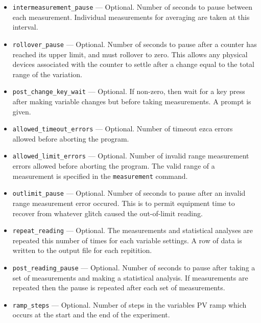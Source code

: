 \begin{itemize}
\begin{itemize}
\begin{itemize}
        \item {\verb+intermeasurement_pause+} ---  Optional. Number of seconds to pause between each measurement.
                Individual measurements for averaging are taken at this interval.
        \item {\verb+rollover_pause+} ---  Optional. Number of seconds to pause after a counter has reached
                its upper limit, and must rollover to zero. This allows any physical devices
                associated with the counter to settle after a change equal to the total range
                of the variation.
        \item {\verb+post_change_key_wait+} ---  Optional. If non-zero, then wait for a key press after
                making variable changes but before taking measurements. A prompt is given.
        \item {\verb+allowed_timeout_errors+} ---  Optional. Number of timeout ezca errors allowed before aborting the
                program. 
        \item {\verb+allowed_limit_errors+} ---  Optional. Number of invalid range measurement errors 
                allowed before aborting the
                program. The valid range of a measurement is specified in the {\verb+measurement+} command.
        \item {\verb+outlimit_pause+} ---  Optional. Number of seconds to pause after an invalid range measurement error
                occured. This is to permit equipment time to recover from whatever glitch caused the out-of-limit
                reading.
        \item {\verb+repeat_reading+} --- Optional. The measurements and statistical analyses are repeated this number of 
                times for each variable settings. A row of data is written to the output file
                for each repitition.
        \item {\verb+post_reading_pause+} --- Optional. Number of seconds to pause after taking a 
                set of measurements and making a statistical analysis.
                If measurements are repeated then the pause is repeated after each set of measurements.
        \item {\verb+ramp_steps+} --- Optional. Number of steps in the variables PV ramp 
                which occurs at the start and the end of the experiment.


\end{itemize}
\end{itemize}
\end{itemize}
